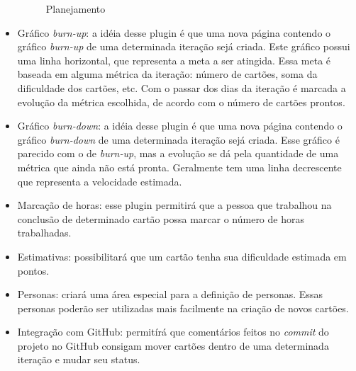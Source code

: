 \begin{itemize}
{	\begin{figure}[H]
	  \centering
	  \caption{Planejamento}\label{figura:planejamento}
	\end{figure}
	}
	\item{Gráfico \textit{burn-up}: a idéia desse plugin é que uma nova página contendo o gráfico \textit{burn-up} de uma determinada iteração sejá criada. Este gráfico possui uma linha horizontal, que representa a meta a ser atingida. Essa meta é baseada em alguma métrica da iteração: número de cartões, soma da dificuldade dos cartões, etc. Com o passar dos dias da iteração é marcada a evolução da métrica escolhida, de acordo com o número de cartões prontos.}
	\item{Gráfico \textit{burn-down}: a idéia desse plugin é que uma nova página contendo o gráfico \textit{burn-down} de uma determinada iteração sejá criada. Esse gráfico é parecido com o de \textit{burn-up}, mas a evolução se dá pela quantidade de uma métrica que ainda não está pronta. Geralmente tem uma linha decrescente que representa a velocidade estimada.}
	\item{Marcação de horas: esse plugin permitirá que a pessoa que trabalhou na conclusão de determinado cartão possa marcar o número de horas trabalhadas.}
	\item{Estimativas: possibilitará que um cartão tenha sua dificuldade estimada em pontos.}
	\item{Personas: criará uma área especial para a definição de personas. Essas personas poderão ser utilizadas mais facilmente na criação de novos cartões.}
	\item{Integração com GitHub: permitírá que comentários feitos no \textit{commit} do projeto no GitHub consigam mover cartões dentro de uma determinada iteração e mudar seu status.}
\end{itemize}
